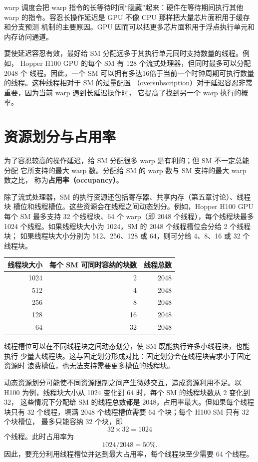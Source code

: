 warp 调度会把 warp 指令的长等待时间“隐藏”起来：硬件在等待期间执行其他 warp
的指令。容忍长操作延迟是 GPU 不像 CPU 那样把大量芯片面积用于缓存和分支预测
机制的主要原因。GPU 因而可以把更多芯片面积用于浮点执行单元和内存访问通道。

要使延迟容忍有效，最好给 SM 分配远多于其执行单元同时支持数量的线程。例如，
Hopper H100 GPU 的每个 SM 有 128 个流式处理器，但同时最多可以分配 2048 个
线程。因此，一个 SM 可以拥有多达16倍于当前一个时钟周期可执行数量的线程。这种线程相对于 SM 的过量配置
（oversubscription）对于延迟容忍非常重要，因为当前 warp 遇到长延迟操作时，
它提高了找到另一个 warp 执行的概率。

\section{资源划分与占用率}
\label{sec:resource-partitioning}

为了容忍较高的操作延迟，给 SM 分配很多 warp 是有利的；但 SM 不一定总能分配
它所支持的最大 warp 数。分配给 SM 的 warp 数与 SM 支持的最大 warp 数之比，
称为\textbf{占用率（occupancy）}。

除了流式处理器，SM 的执行资源还包括寄存器、共享内存（第五章讨论）、线程块
槽位和线程槽位。这些资源会在线程之间动态划分。例如，Hopper H100 GPU 每个
SM 最多支持 32 个线程块、64 个 warp（即 2048 个线程），每个线程块最多 1024
个线程。如果线程块大小为 1024，SM 的 2048 个线程槽位会分给 2 个线程块；
如果线程块大小分别为 512、256、128 或 64，则可分给 4、8、16 或 32 个线程块。

\begin{center}
\small
\begin{tabular}{r|r|r}
  \toprule
  线程块大小 & 每个 SM 可同时容纳的块数 & 线程总数\\
  \midrule
  1024 & 2 & 2048\\
  512 & 4 & 2048\\
  256 & 8 & 2048\\
  128 & 16 & 2048\\
  64 & 32 & 2048\\
  \bottomrule
\end{tabular}
\end{center}

线程槽位可以在不同线程块之间动态划分，使 SM 既能执行许多小线程块，也能执行
少量大线程块。这与固定划分形成对比：固定划分会在线程块需求小于固定资源时
浪费槽位，也无法支持需要更多槽位的线程块。

动态资源划分可能使不同资源限制之间产生微妙交互，造成资源利用不足。以 H100
为例，线程块大小从 1024 变化到 64 时，每个 SM 的线程块数从 2 变化到 32，
这些情况下分配给 SM 的线程总数都是 2048，占用率最大。但如果每个线程块只有
32 个线程，填满 2048 个线程槽位需要 64 个块；每个 H100 SM 只有 32 个块槽位，
最多只能容纳 32 个块，即
\[
  32\times32=1024
\]
个线程。此时占用率为
\[
  1024/2048=50\%.
\]
因此，要充分利用线程槽位并达到最大占用率，每个线程块至少需要 64 个线程。

